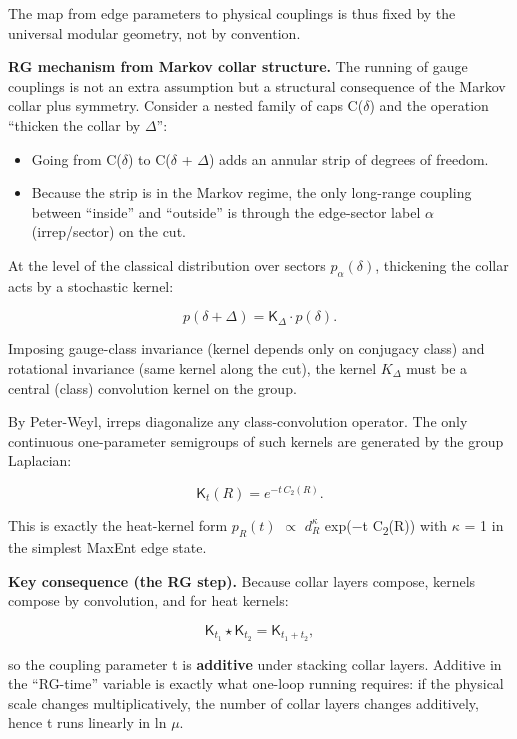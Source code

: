 \documentclass[11pt,a4paper]{article}
\theoremstyle{remark}
\providecommand{\tightlist}{%
  \setlength{\itemsep}{0pt}\setlength{\parskip}{0pt}}
\begin{document}
The map from edge parameters to physical couplings is thus fixed by the
universal modular geometry, not by convention.

\textbf{RG mechanism from Markov collar structure.} The running of gauge couplings is not an extra assumption but a structural consequence of the Markov collar plus symmetry. Consider a nested family of caps C(\ensuremath{\delta}) and the operation ``thicken the collar by \ensuremath{\Delta}'':

\begin{itemize}
\tightlist
\item
  Going from C(\ensuremath{\delta}) to C(\ensuremath{\delta} + \ensuremath{\Delta}) adds an annular strip of degrees of freedom.
\item
  Because the strip is in the Markov regime, the only long-range coupling between ``inside'' and ``outside'' is through the edge-sector label \ensuremath{\alpha} (irrep/sector) on the cut.
\end{itemize}

At the level of the classical distribution over sectors \(p_\ensuremath{\alpha}(\ensuremath{\delta})\), thickening the collar acts by a stochastic kernel:

\[
p(\delta + \Delta) = \mathsf{K}_\Delta \cdot p(\delta).
\]

Imposing gauge-class invariance (kernel depends only on conjugacy class) and rotational invariance (same kernel along the cut), the kernel \(K_\ensuremath{\Delta}\) must be a central (class) convolution kernel on the group.

By Peter-Weyl, irreps diagonalize any class-convolution operator. The only continuous one-parameter semigroups of such kernels are generated by the group Laplacian:

\[
\mathsf{K}_t(R) = e^{-t \, C_2(R)}.
\]

This is exactly the heat-kernel form \(p_R(t)\) \ensuremath{\propto} \(d_R^\ensuremath{\kappa}\) exp(\ensuremath{-}t C\textsubscript{2}(R)) with \ensuremath{\kappa} = 1 in the simplest MaxEnt edge state.

\textbf{Key consequence (the RG step).} Because collar layers compose, kernels compose by convolution, and for heat kernels:

\[
\mathsf{K}_{t_1} \star \mathsf{K}_{t_2} = \mathsf{K}_{t_1 + t_2},
\]

so the coupling parameter t is \textbf{additive} under stacking collar layers. Additive in the ``RG-time'' variable is exactly what one-loop running requires: if the physical scale changes multiplicatively, the number of collar layers changes additively, hence t runs linearly in ln \ensuremath{\mu}.
\end{document}
